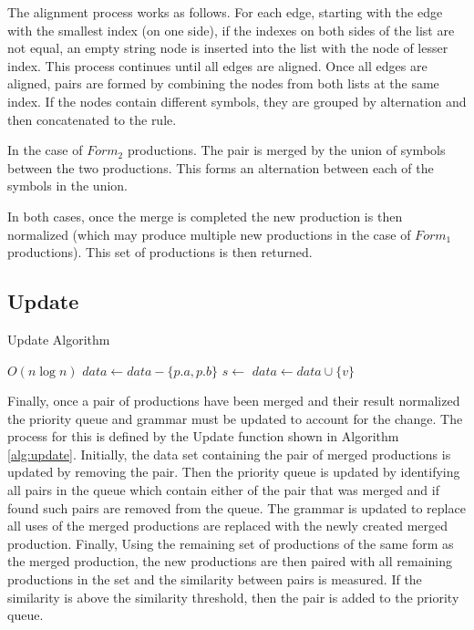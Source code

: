 \documentclass[10pt,nocc]{xrese_report}
\begin{document}
The alignment process works as follows. For each edge, starting with the edge with the smallest index (on one side), if the indexes on both sides of the list are not equal, an empty string node is inserted into the list with the node of lesser index. This process continues until all edges are aligned. Once all edges are aligned, pairs are formed by combining the nodes from both lists at the same index. If the nodes contain different symbols, they are grouped by alternation and then concatenated to the rule.

In the case of $Form_2$ productions. The pair is merged by the union of symbols between the two productions. This forms an alternation between each of the symbols in the union.

In both cases, once the merge is completed the new production is then normalized (which may produce multiple new productions in the case of $Form_1$ productions). This set of productions is then returned.

\subsection{Update}

\begin{algorithm}[tb]
 \caption{Update Algorithm}\label{alg:update}
 \begin{algorithmic}[1]
  \Comment $O(n\log n)$
    \State $data \gets data - \{p.a,p.b\}$
        \State {}
      \EndIf
    \EndFor
      \State $s \gets$ 
        \State {}
      \EndIf
    \EndFor
    \State $data \gets data \cup \{v\}$
        \State {}
        \State {}
      \EndIf
    \EndFor
  \EndFunction
 \end{algorithmic}
\end{algorithm}

Finally, once a pair of productions have been merged and their result normalized the priority queue and grammar must be updated to account for the change. The process for this is defined by the Update function shown in Algorithm \ref{alg:update}. Initially, the data set containing the pair of merged productions is updated by removing the pair. Then the priority queue is updated by identifying all pairs in the queue which contain either of the pair that was merged and if found such pairs are removed from the queue. The grammar is updated to replace all uses of the merged productions are replaced with the newly created merged production. Finally, Using the remaining set of productions of the same form as the merged production, the new productions are then paired with all remaining productions in the set and the similarity between pairs is measured. If the similarity is above the similarity threshold, then the pair is added to the priority queue.
\end{document}
